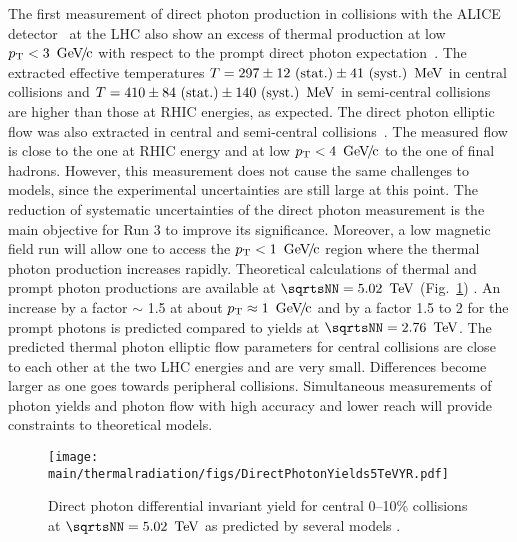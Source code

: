 \documentclass[../report.tex]{subfiles}
\providecommand{\main}{..}
\begin{document}
The first measurement of direct photon production in \PbPb collisions with the ALICE detector~\cite{Aamodt:2008zz} at the LHC also show an excess of thermal production at low $\pT < \unit[3]{\UGeVc}$ with respect to the prompt direct photon expectation~\cite{Adam:2015lda}. The extracted effective temperatures $T=\unit[297\pm12~\mathrm{(stat.)}\pm41~\mathrm{(syst.)}]{\UMeV}$ in central collisions and $T=\unit[410\pm84~\mathrm{(stat.)}\pm140~\mathrm{(syst.)}]{\UMeV}$ in semi-central collisions are higher than those at RHIC energies, as expected.
The direct photon elliptic flow was also extracted in central and semi-central collisions~\cite{Acharya:2018bdy}. The measured flow is close to the one at RHIC energy and at low $\pT < \unit[4]{\UGeVc}$ to the one of final hadrons. However, this measurement does not cause the same challenges to models, since the experimental uncertainties are still large at this point.
The reduction of systematic uncertainties of the direct photon measurement is the main objective for Run 3 to improve its significance. Moreover, a low magnetic field run will allow one to access the $\pT < \unit[1]{\UGeVc}$ region where the thermal photon production increases rapidly. Theoretical calculations of thermal and prompt photon productions are available at $\sqrtsNN = \unit[5.02]{\UTeV}$ (Fig.~\ref{fig:LHCExpectations_RealPhotons}) \cite{Paquet:2015lta,Paquet:2016ime,Paquet:2017wji,Dasgupta:2018pjm,vanHees:2014ida}. An increase by a factor $\sim$ 1.5 at about $\pT \approx \unit[1]{\UGeVc}$ and by a factor 1.5 to 2 for the prompt photons is predicted compared to yields at $\sqrtsNN = \unit[2.76]{\UTeV}$. The predicted thermal photon elliptic flow parameters for central collisions are close to each other at the two LHC energies  and are very small. Differences become larger as one goes towards peripheral collisions. Simultaneous measurements of photon yields and photon flow with high accuracy and lower \pT{} reach will provide constraints to theoretical models.
\begin{figure}[htb]
\centering
\texttt{[image: \\main/thermalradiation/figs/DirectPhotonYields5TeVYR.pdf]}
\caption{Direct photon differential invariant yield for central 0--10\% \PbPb{} collisions at $\sqrtsNN = \unit[5.02]{\UTeV}$ as predicted by several models \cite{Paquet:2015lta,Paquet:2016ime,Paquet:2017wji,Dasgupta:2018pjm,vanHees:2014ida}.}
\label{fig:LHCExpectations_RealPhotons}
\end{figure}
\end{document}
